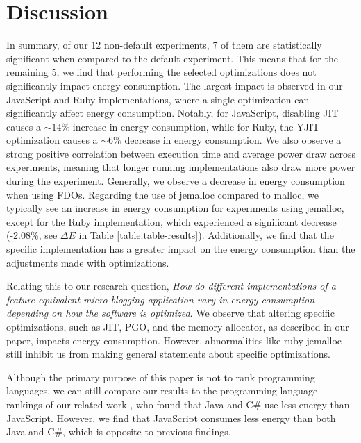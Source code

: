 \documentclass[main.tex]{subfiles}
\begin{document}
\section{Discussion}

In summary, of our 12 non-default experiments, 7 of them are statistically significant when compared to the default experiment. This means that for the remaining 5, we find that performing the selected optimizations does not significantly impact energy consumption. The largest impact is observed in our JavaScript and Ruby implementations, where a single optimization can significantly affect energy consumption. Notably, for JavaScript, disabling JIT causes a $\sim14\%$ increase in energy consumption, while for Ruby, the YJIT optimization causes a $\sim6\%$ decrease in energy consumption. We also observe a strong positive correlation between execution time and average power draw across experiments, meaning that longer running implementations also draw more power during the experiment. Generally, we observe a decrease in energy consumption when using FDOs. Regarding the use of jemalloc compared to malloc, we typically see an increase in energy consumption for experiments using jemalloc, except for the Ruby implementation, which experienced a significant decrease (-2.08\%, see $\Delta E$ in Table \ref{table:table-results}). Additionally, we find that the specific implementation has a greater impact on the energy consumption than the adjustments made with optimizations.

Relating this to our research question, \emph{How do different implementations of a feature equivalent micro-blogging application vary in energy consumption depending on how the software is optimized}. We observe that altering specific optimizations, such as JIT, PGO, and the memory allocator, as described in our paper, impacts energy consumption. However, abnormalities like ruby-jemalloc still inhibit us from making general statements about specific optimizations.

Although the primary purpose of this paper is not to rank programming languages, we can still compare our results to the programming language rankings of our related work \cite{pereira2017energy, Pereira_Couto_Ribeiro_Rua_Cunha_Fernandes_Saraiva_2021, Couto_Pereira_Ribeiro_Rua_Saraiva_2017}, who found that Java and C\# use less energy than JavaScript. However, we find that JavaScript consumes less energy than both Java and C\#, which is opposite to previous findings. 
\end{document}
